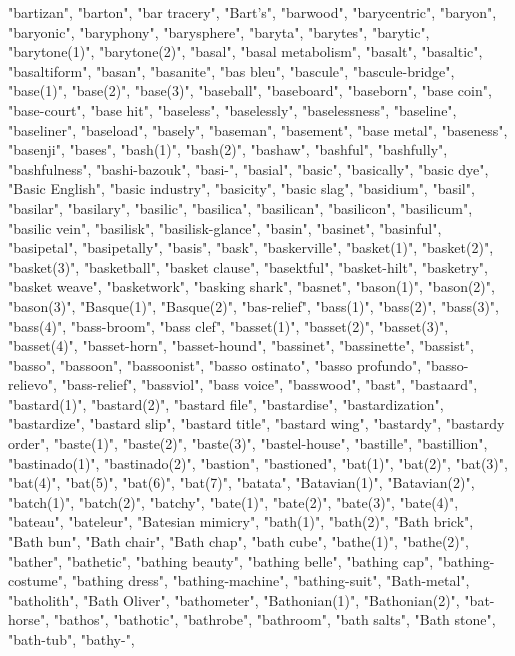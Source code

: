 "bartizan",
"barton",
"bar tracery",
"Bart's",
"barwood",
"barycentric",
"baryon",
"baryonic",
"baryphony",
"barysphere",
"baryta",
"barytes",
"barytic",
"barytone(1)",
"barytone(2)",
"basal",
"basal metabolism",
"basalt",
"basaltic",
"basaltiform",
"basan",
"basanite",
"bas bleu",
"bascule",
"bascule-bridge",
"base(1)",
"base(2)",
"base(3)",
"baseball",
"baseboard",
"baseborn",
"base coin",
"base-court",
"base hit",
"baseless",
"baselessly",
"baselessness",
"baseline",
"baseliner",
"baseload",
"basely",
"baseman",
"basement",
"base metal",
"baseness",
"basenji",
"bases",
"bash(1)",
"bash(2)",
"bashaw",
"bashful",
"bashfully",
"bashfulness",
"bashi-bazouk",
"basi-",
"basial",
"basic",
"basically",
"basic dye",
"Basic English",
"basic industry",
"basicity",
"basic slag",
"basidium",
"basil",
"basilar",
"basilary",
"basilic",
"basilica",
"basilican",
"basilicon",
"basilicum",
"basilic vein",
"basilisk",
"basilisk-glance",
"basin",
"basinet",
"basinful",
"basipetal",
"basipetally",
"basis",
"bask",
"baskerville",
"basket(1)",
"basket(2)",
"basket(3)",
"basketball",
"basket clause",
"basektful",
"basket-hilt",
"basketry",
"basket weave",
"basketwork",
"basking shark",
"basnet",
"bason(1)",
"bason(2)",
"bason(3)",
"Basque(1)",
"Basque(2)",
"bas-relief",
"bass(1)",
"bass(2)",
"bass(3)",
"bass(4)",
"bass-broom",
"bass clef",
"basset(1)",
"basset(2)",
"basset(3)",
"basset(4)",
"basset-horn",
"basset-hound",
"bassinet",
"bassinette",
"bassist",
"basso",
"bassoon",
"bassoonist",
"basso ostinato",
"basso profundo",
"basso-relievo",
"bass-relief",
"bassviol",
"bass voice",
"basswood",
"bast",
"bastaard",
"bastard(1)",
"bastard(2)",
"bastard file",
"bastardise",
"bastardization",
"bastardize",
"bastard slip",
"bastard title",
"bastard wing",
"bastardy",
"bastardy order",
"baste(1)",
"baste(2)",
"baste(3)",
"bastel-house",
"bastille",
"bastillion",
"bastinado(1)",
"bastinado(2)",
"bastion",
"bastioned",
"bat(1)",
"bat(2)",
"bat(3)",
"bat(4)",
"bat(5)",
"bat(6)",
"bat(7)",
"batata",
"Batavian(1)",
"Batavian(2)",
"batch(1)",
"batch(2)",
"batchy",
"bate(1)",
"bate(2)",
"bate(3)",
"bate(4)",
"bateau",
"bateleur",
"Batesian mimicry",
"bath(1)",
"bath(2)",
"Bath brick",
"Bath bun",
"Bath chair",
"Bath chap",
"bath cube",
"bathe(1)",
"bathe(2)",
"bather",
"bathetic",
"bathing beauty",
"bathing belle",
"bathing cap",
"bathing-costume",
"bathing dress",
"bathing-machine",
"bathing-suit",
"Bath-metal",
"batholith",
"Bath Oliver",
"bathometer",
"Bathonian(1)",
"Bathonian(2)",
"bat-horse",
"bathos",
"bathotic",
"bathrobe",
"bathroom",
"bath salts",
"Bath stone",
"bath-tub",
"bathy-",
